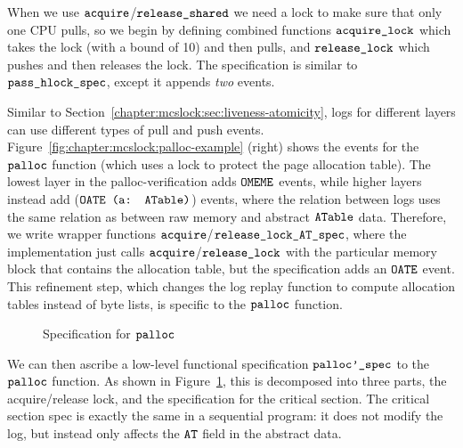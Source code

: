 When we use ${\mathrm{\texttt{acquire}}}$/${\mathrm{\texttt{release\_shared}}}$ we
need a lock to make sure that only one CPU pulls, so we begin
by defining combined functions ${\mathrm{\texttt{acquire\_lock}}}$ which
takes the lock (with a bound of 10) and then pulls, and
${\mathrm{\texttt{release\_lock}}}$ which pushes and then releases the
lock. The specification is similar to ${\mathrm{\texttt{pass\_hlock\_spec}}}$,
except it appends \emph{two} events.

Similar to Section~\ref{chapter:mcslock:sec:liveness-atomicity}, logs for different
layers can use different types of pull and push events.
Figure~\ref{fig:chapter:mcslock:palloc-example} (right) shows the events for the
${\mathrm{\texttt{palloc}}}$ function (which uses a lock to protect the page
allocation table). The lowest layer in the palloc-verification adds
${\mathrm{\texttt{OMEME}}}$ events, while higher layers instead add
(${\mathrm{\texttt{OATE (a: ATable)}}}$) events, where the relation between logs
uses the same relation as between raw memory and abstract
${\mathrm{\texttt{ATable}}}$ data. Therefore, we write wrapper functions
${\mathrm{\texttt{acquire}}}$/${\mathrm{\texttt{release\_lock\_AT\_spec}}}$, where the
implementation just calls ${\mathrm{\texttt{acquire}}}$/${\mathrm{\texttt{release\_lock}}}$
with the particular memory block that contains the allocation table,
but the specification adds an ${\mathrm{\texttt{OATE}}}$ event.
This refinement step, which changes the log replay function to compute
allocation tables instead of byte lists, is
specific to the ${\mathrm{\texttt{palloc}}}$ function.

\begin{figure}




\caption{Specification for ${\mathrm{\texttt{palloc}}}$}
\label{fig:chapter:mcslock:palloc-spec}
\end{figure}

We can then ascribe a low-level functional specification
${\mathrm{\texttt{palloc'\_spec}}}$ to the ${\mathrm{\texttt{palloc}}}$ function. As shown
in Figure~\ref{fig:chapter:mcslock:palloc-spec}, this is decomposed into three parts, the
acquire/release lock, and the specification for the critical
section. The critical section spec is exactly the same in a sequential
program: it does not modify the log, but instead only affects the ${\mathrm{\texttt{AT}}}$ field in the abstract data.

